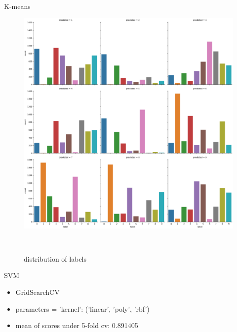 \documentclass[
 size=12pt,
 paper=smartboard, %
 mode=present, %
 display=slides, %
style=tuliplab,
pauseslide,
fleqn,leqno]{powerdot}
\begin{document}
\begin{slide}{K-means}
\begin{itemize}
\begin{figure}[h]
\begin{minipage}[t]{0.4\linewidth}
        \includegraphics[width=1.2\textwidth]{figures/label-count-9.eps}
        \caption{distribution of labels}
        \label{fig:label-count-9}
      \end{minipage} 
    \end{figure}
  \end{itemize}
\end{slide}

\begin{slide}{SVM}
  \begin{itemize}
  \item GridSearchCV \pause
  \item parameters = {'kernel': ('linear', 'poly', 'rbf')} \pause
  \item mean of scores under 5-fold cv: 0.891405
  \end{itemize}
\end{slide}
\end{document}

